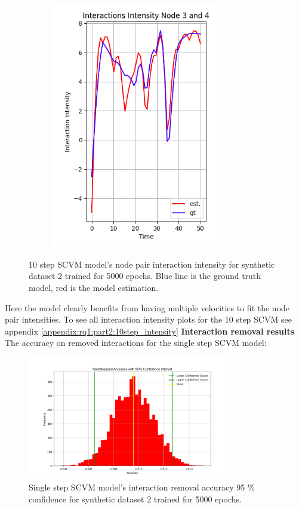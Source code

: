 \begin{figure}[H]
    \hfill
    \begin{subfigure}[b]{0.45\textwidth}
        \includegraphics[width=0.8\textwidth]{0_images/rq1_10step_SCVM_intensity2.png}
    \end{subfigure}
    \caption{10 step SCVM model's node pair interaction intensity for synthetic dataset 2 trained for 5000 epochs. Blue line is the ground truth model, red is the model estimation.}
    \label{fig:RQ1:part2:10step_intensity}
\end{figure}
\noindent
Here the model clearly benefits from having multiple velocities to fit the node pair intensities. To see all interaction intensity plots for the 10 step SCVM see appendix \ref{appendix:rq1:part2:10step_intensity}
\clearpage
\noindent
\textbf{Interaction removal results}
\\
The accuracy on removed interactions for the single step SCVM model:
\begin{figure}[H]
    \centering
    \centering
    \includegraphics[width=0.8\textwidth]{0_images/rq1_2_1step_accuracy_plot.png}
    \caption{Single step SCVM model's interaction removal accuracy 95 \% confidence for synthetic dataset 2 trained for 5000 epochs.}
    \label{fig:RQ1:1step_SCVM_accuracy}
\end{figure}
